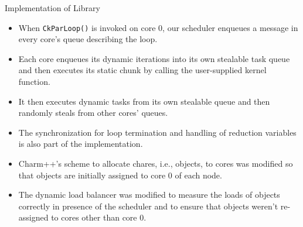 
\begin{frame}{Implementation of Library}
\begin{itemize}

\small \item \small When {\tt CkParLoop()} is invoked on core 0, our scheduler enqueues a message in every core's queue describing the loop. 
\item \small Each core enqueues its dynamic iterations into its own stealable task queue and then executes its static chunk by calling the user-supplied kernel function. 
\item \small It then executes dynamic tasks from its own stealable queue and then randomly steals from other cores' queues.
\item \small The synchronization for loop termination and handling of reduction variables is also part of the implementation.
\item \small  Charm++'s scheme to allocate chares, i.e., objects, to cores was modified so that objects are initially assigned to core 0 of each node. 
\item \small The dynamic load balancer was modified to measure the loads of objects correctly in presence of the scheduler and to ensure that objects weren't re-assigned to cores other than core 0.
\end{itemize}
\end{frame} 



